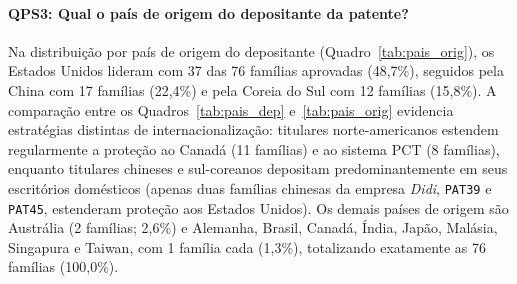 \documentclass[12pt,a4paper]{article}
\begin{document}
\paragraph{QPS3: Qual o país de origem do depositante da patente?}
Na distribuição por país de origem do depositante (Quadro~\ref{tab:pais_orig}), os Estados Unidos lideram com 37 das 76 famílias aprovadas (48,7\%), seguidos pela China com 17 famílias (22,4\%) e pela Coreia do Sul com 12 famílias (15,8\%). A comparação entre os Quadros~\ref{tab:pais_dep} e~\ref{tab:pais_orig} evidencia estratégias distintas de internacionalização: titulares norte-americanos estendem regularmente a proteção ao Canadá (11 famílias) e ao sistema PCT (8 famílias), enquanto titulares chineses e sul-coreanos depositam predominantemente em seus escritórios domésticos (apenas duas famílias chinesas da empresa \textit{Didi}, \texttt{PAT39} e \texttt{PAT45}, estenderam proteção aos Estados Unidos). Os demais países de origem são Austrália (2 famílias; 2,6\%) e Alemanha, Brasil, Canadá, Índia, Japão, Malásia, Singapura e Taiwan, com 1 família cada (1,3\%), totalizando exatamente as 76 famílias (100,0\%).
\end{document}
